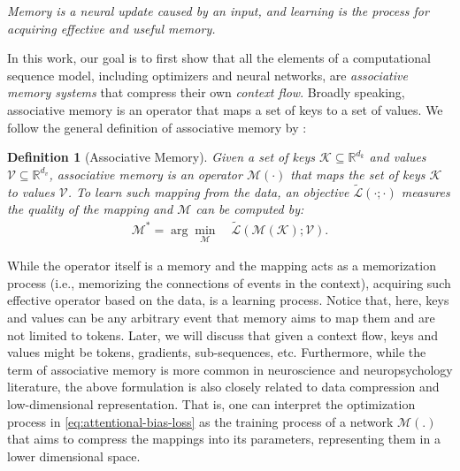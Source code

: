 \documentclass{article}
\newcommand{\citet}{\textcite}
\newtheorem{dfn}{Definition}
\newcommand{\M}[0]{\mathcal{M}}
\begin{document}
\vspace{8pt}
\begin{myboxi}
\textit{Memory is a neural update caused by an input, and {learning} is the process for acquiring effective and useful memory.}
\end{myboxi}
\vspace{8pt}

In this work, our goal is to first show that all the elements of a computational sequence model, including optimizers and neural networks, are \emph{associative memory systems} that compress their own \emph{context flow}. Broadly speaking, associative memory is an operator that maps a set of keys to a set of values. We follow the general definition of associative memory by \citet{behrouz2025Miras}: 

\begin{dfn}[Associative Memory] \label{def:associative-memory}
    Given a set of keys $\mathcal{K} \subseteq \mathbb{R}^{d_k}$ and values $\mathcal{V} \subseteq \mathbb{R}^{d_v}$, associative memory is an operator $\M(\cdot)$  
    that maps the set of keys $\mathcal{K}$ to values $\mathcal{V}$. To learn such mapping from the data, an objective $\tilde{\mathcal{L}}(\cdot;\cdot)$ measures the quality of the mapping and $\M$ 
    can be computed by:
\begin{align}\label{eq:attentional-bias-loss}
    \M^* = \arg\min_{\M}\quad \tilde{\mathcal{L}}(\M(\mathcal{K}); \mathcal{V}).
\end{align}
\end{dfn}
While the operator itself is a memory and the mapping acts as a memorization process (i.e., memorizing the connections of events in the context), acquiring such effective operator based on the data, is a learning process. Notice that, here, keys and values can be any arbitrary event that memory aims to map them and are not limited to tokens. Later, we will discuss that given a context flow, keys and values might be tokens, gradients, sub-sequences, etc. Furthermore, while the term of associative memory is more common in neuroscience and neuropsychology literature, the above formulation is also closely related to data compression and low-dimensional representation. That is, one can interpret the optimization process in \autoref{eq:attentional-bias-loss} as the training process of a network $\M(.)$ that aims to compress the mappings into its parameters, representing them in a lower dimensional space.   
\end{document}
